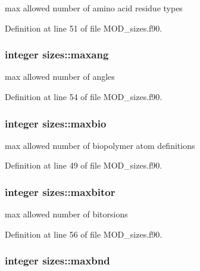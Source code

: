 max allowed number of amino acid residue types 



Definition at line 51 of file M\-O\-D\-\_\-sizes.\-f90.

\hypertarget{classsizes_a372954083ea1616653faa864a2e40840}{
\subsubsection[{maxang}]{\setlength{\rightskip}{0pt plus 5cm}integer sizes\-::maxang}}\label{classsizes_a372954083ea1616653faa864a2e40840}


max allowed number of angles 



Definition at line 54 of file M\-O\-D\-\_\-sizes.\-f90.

\hypertarget{classsizes_aa64c63004cc10f0ed45fff4091596ad4}{
\subsubsection[{maxbio}]{\setlength{\rightskip}{0pt plus 5cm}integer sizes\-::maxbio}}\label{classsizes_aa64c63004cc10f0ed45fff4091596ad4}


max allowed number of biopolymer atom definitions 



Definition at line 49 of file M\-O\-D\-\_\-sizes.\-f90.

\hypertarget{classsizes_afcf5f37881e4a77baf50cb1e39d8aa62}{
\subsubsection[{maxbitor}]{\setlength{\rightskip}{0pt plus 5cm}integer sizes\-::maxbitor}}\label{classsizes_afcf5f37881e4a77baf50cb1e39d8aa62}


max allowed number of bitorsions 



Definition at line 56 of file M\-O\-D\-\_\-sizes.\-f90.

\hypertarget{classsizes_a0b1f98c2f45a8573fc896ea7b4cd18f6}{
\subsubsection[{maxbnd}]{\setlength{\rightskip}{0pt plus 5cm}integer sizes\-::maxbnd}}\label{classsizes_a0b1f98c2f45a8573fc896ea7b4cd18f6}


